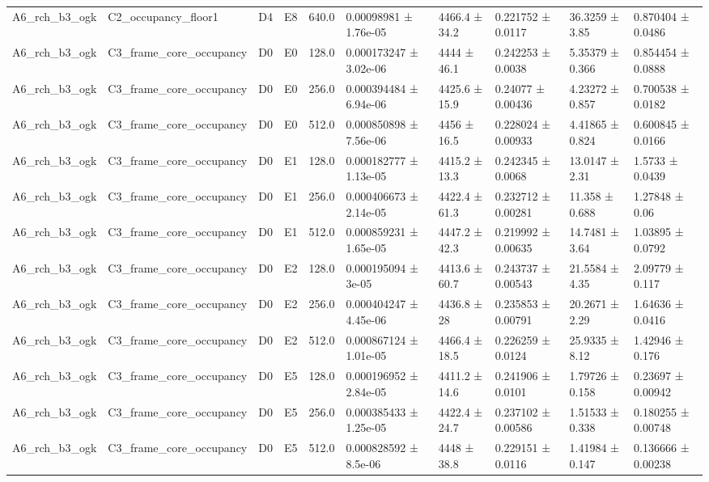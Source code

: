 \begin{table}
\begin{tabular}{llllllllll}
A6\_rch\_b3\_ogk & C2\_occupancy\_floor1 & D4 & E8 & 640.0 & 0.00098981 ± 1.76e-05 & 4466.4 ± 34.2 & 0.221752 ± 0.0117 & 36.3259 ± 3.85 & 0.870404 ± 0.0486 \\
A6\_rch\_b3\_ogk & C3\_frame\_core\_occupancy & D0 & E0 & 128.0 & 0.000173247 ± 3.02e-06 & 4444 ± 46.1 & 0.242253 ± 0.0038 & 5.35379 ± 0.366 & 0.854454 ± 0.0888 \\
A6\_rch\_b3\_ogk & C3\_frame\_core\_occupancy & D0 & E0 & 256.0 & 0.000394484 ± 6.94e-06 & 4425.6 ± 15.9 & 0.24077 ± 0.00436 & 4.23272 ± 0.857 & 0.700538 ± 0.0182 \\
A6\_rch\_b3\_ogk & C3\_frame\_core\_occupancy & D0 & E0 & 512.0 & 0.000850898 ± 7.56e-06 & 4456 ± 16.5 & 0.228024 ± 0.00933 & 4.41865 ± 0.824 & 0.600845 ± 0.0166 \\
A6\_rch\_b3\_ogk & C3\_frame\_core\_occupancy & D0 & E1 & 128.0 & 0.000182777 ± 1.13e-05 & 4415.2 ± 13.3 & 0.242345 ± 0.0068 & 13.0147 ± 2.31 & 1.5733 ± 0.0439 \\
A6\_rch\_b3\_ogk & C3\_frame\_core\_occupancy & D0 & E1 & 256.0 & 0.000406673 ± 2.14e-05 & 4422.4 ± 61.3 & 0.232712 ± 0.00281 & 11.358 ± 0.688 & 1.27848 ± 0.06 \\
A6\_rch\_b3\_ogk & C3\_frame\_core\_occupancy & D0 & E1 & 512.0 & 0.000859231 ± 1.65e-05 & 4447.2 ± 42.3 & 0.219992 ± 0.00635 & 14.7481 ± 3.64 & 1.03895 ± 0.0792 \\
A6\_rch\_b3\_ogk & C3\_frame\_core\_occupancy & D0 & E2 & 128.0 & 0.000195094 ± 3e-05 & 4413.6 ± 60.7 & 0.243737 ± 0.00543 & 21.5584 ± 4.35 & 2.09779 ± 0.117 \\
A6\_rch\_b3\_ogk & C3\_frame\_core\_occupancy & D0 & E2 & 256.0 & 0.000404247 ± 4.45e-06 & 4436.8 ± 28 & 0.235853 ± 0.00791 & 20.2671 ± 2.29 & 1.64636 ± 0.0416 \\
A6\_rch\_b3\_ogk & C3\_frame\_core\_occupancy & D0 & E2 & 512.0 & 0.000867124 ± 1.01e-05 & 4466.4 ± 18.5 & 0.226259 ± 0.0124 & 25.9335 ± 8.12 & 1.42946 ± 0.176 \\
A6\_rch\_b3\_ogk & C3\_frame\_core\_occupancy & D0 & E5 & 128.0 & 0.000196952 ± 2.84e-05 & 4411.2 ± 14.6 & 0.241906 ± 0.0101 & 1.79726 ± 0.158 & 0.23697 ± 0.00942 \\
A6\_rch\_b3\_ogk & C3\_frame\_core\_occupancy & D0 & E5 & 256.0 & 0.000385433 ± 1.25e-05 & 4422.4 ± 24.7 & 0.237102 ± 0.00586 & 1.51533 ± 0.338 & 0.180255 ± 0.00748 \\
A6\_rch\_b3\_ogk & C3\_frame\_core\_occupancy & D0 & E5 & 512.0 & 0.000828592 ± 8.5e-06 & 4448 ± 38.8 & 0.229151 ± 0.0116 & 1.41984 ± 0.147 & 0.136666 ± 0.00238 \\

\end{tabular}
\end{table}
